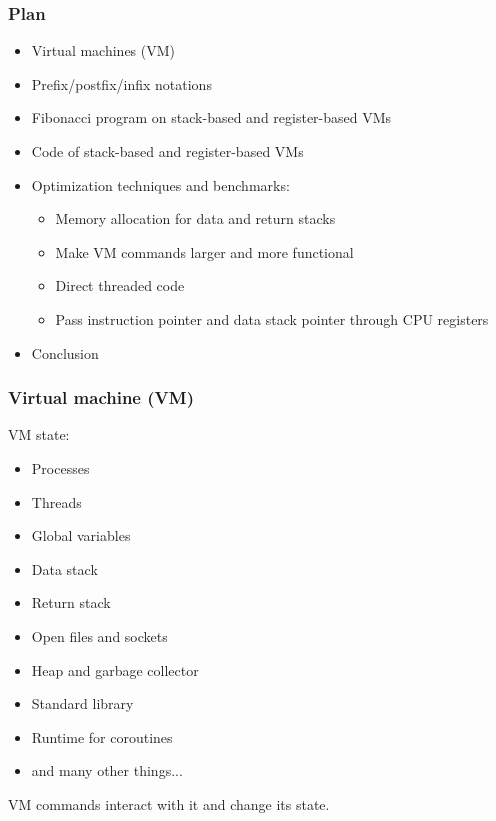 \documentclass[hyperref={colorlinks=true},xcolor=table]{beamer}
\begin{document}
\begin{frame}
  \frametitle{Plan}
  \begin{itemize}
  \item Virtual machines (VM)
  \item Prefix/postfix/infix notations
  \item Fibonacci program on stack-based and register-based VMs
  \item Code of stack-based and register-based VMs
  \item Optimization techniques and benchmarks:
    \begin{itemize}
    \item Memory allocation for data and return stacks
    \item Make VM commands larger and more functional
    \item Direct threaded code
    \item Pass instruction pointer and data stack pointer through CPU
      registers
    \end{itemize}
  \item Conclusion
  \end{itemize}
\end{frame}

\begin{frame}
  \frametitle{Virtual machine (VM)}
  VM state:
  \begin{itemize}
  \item Processes
  \item Threads
  \item Global variables
  \item Data stack
  \item Return stack
  \item Open files and sockets
  \item Heap and garbage collector
  \item Standard library
  \item Runtime for coroutines
  \item and many other things...
  \end{itemize}
  VM commands interact with it and change its state.
\end{frame}
\end{document}
